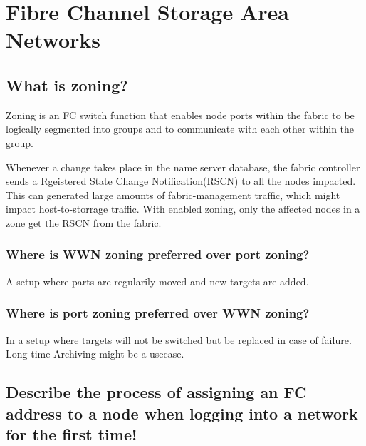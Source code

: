 \section{Fibre Channel Storage Area Networks} %
\label{sec:fibre_channel_storage_area_networks}

\subsection{What is zoning?} %
\label{sub:what_is_zoning}
	Zoning is an FC switch function
	that enables node ports within the fabric to be logically segmented
	into groups and to communicate with each other within the group.

	Whenever a change takes place in the name server database,
	the fabric controller sends a Rgeistered State Change Notification(RSCN)
	to all the nodes impacted.
	This can generated large amounts of fabric-management traffic,
	which might impact host-to-storrage traffic.
	With enabled zoning,
	only the affected nodes in a zone get the RSCN from the fabric.

\subsubsection{Where is WWN zoning preferred over port zoning?} %
\label{ssub:where_is_wwn_zoning_preferred_over_port_zoning}
	A setup where parts are regularily moved
	and new targets are added.

\subsubsection{Where is port zoning preferred over WWN zoning?} %
\label{ssub:where_is_port_zoning_preferred_over_wwn_zoning}
	In a setup where targets will not be switched
	but be replaced in case of failure.
	Long time Archiving might be a usecase.	


\subsection{Describe the process of assigning an FC address to a node when logging into a network for the first time!} %
\label{sub:describe_the_process_of_assigning_an_fc_address_to_a_node_when_logging_into_a_network_for_the_first_time}

